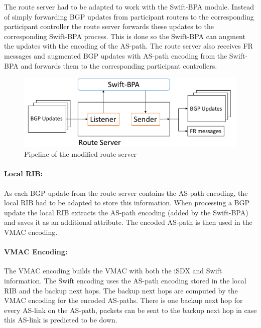 The route server had to be adapted to work with the Swift-BPA module. 
Instead of simply forwarding BGP updates from participant routers to the corresponding participant controller the route server forwards these updates to the corresponding Swift-BPA process. This is done so the Swift-BPA can augment the updates with the encoding of the AS-path. The route server also receives FR messages and augmented BGP updates with AS-path encoding from the Swift-BPA and forwards them to the corresponding participant controllers. 
\begin{figure}[h]
\center
\includegraphics[scale = 0.45]{Figures/design_route_server_cropped2.pdf}
\caption{Pipeline of the modified route server}
\end{figure}


\paragraph{\label{chapter4:Changes to the iSDX:local RIB}Local RIB:}

As each BGP update from the route server contains the AS-path encoding, the local RIB had to be adapted to store this information. 
When processing a BGP update the local RIB extracts the AS-path encoding (added by the Swift-BPA) and saves it as an additional attribute. The encoded AS-path is then used in the VMAC encoding. 

\paragraph{\label{chapter4:Changes to the iSDX:Vmac Encoding}VMAC Encoding:}
The VMAC encoding builds the VMAC with both  the iSDX and Swift information. The Swift encoding uses the AS-path encoding stored in the local RIB and the backup next hops. The backup next hops are computed by the VMAC encoding for the encoded AS-paths. There is one backup next hop for every AS-link on the AS-path, packets can be sent to the backup next hop in case this AS-link is predicted to be down. \\

\newpage
